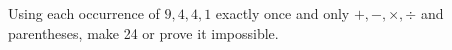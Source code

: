 Using each occurrence of $9,4,4,1$ exactly once and only $+,-,\times,\div$ and parentheses, make 24 or prove it impossible.
